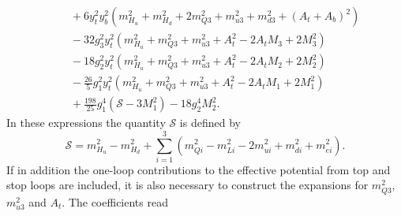 \documentclass[preprint,amsmath,amssymb,aps,superscriptaddress,prd,showpacs,floatfix]{revtex4-1}
\begin{document}
\begin{subequations}
\begin{align}
&\quad{}+6y_t^2y_b^2\left ( m_{H_u}^2+m_{H_d}^2+2m_{Q3}^2+m_{u3}^2+m_{d3}^2+(A_t+A_b)^2\right )\nonumber\\
&\quad{}-32g_3^2y_t^2\left ( m_{H_u}^2+m_{Q3}^2+m_{u3}^2+A_t^2-2A_tM_3+2M_3^2\right )\nonumber\\
&\quad{}-18g_2^2y_t^2\left ( m_{H_u}^2+m_{Q3}^2+m_{u3}^2+A_t^2-2A_tM_2+2M_2^2\right )\nonumber\\
&\quad{}-\frac{26}{5}g_1^2y_t^2\left ( m_{H_u}^2+m_{Q3}^2+m_{u3}^2+A_t^2-2A_tM_1+2M_1^2\right )\nonumber\\
&\quad{}+\frac{198}{25}g_1^4\left ( \mathcal{S}-3M_1^2\right )-18g_2^4M_2^2.\label{eq:MSSMmHu2b2}
\end{align}
\end{subequations}
In these expressions the quantity $\mathcal{S}$ is defined by
\begin{equation}\label{eq:MSSMgaugeBetaContribution}
\mathcal{S}=m_{H_u}^2-m_{H_d}^2+\sum_{i=1}^3\left ( m_{Qi}^2-m_{Li}^2-2m_{ui}^2+m_{di}^2+m_{ei}^2\right ).
\end{equation}
If in addition the one-loop contributions to the effective potential from top and stop loops are included, it is also
necessary to construct the expansions for $m_{Q3}^2$, $m_{u3}^2$ and $A_t$. The coefficients read
\end{document}
